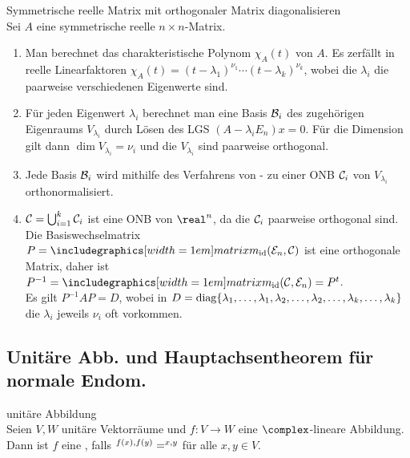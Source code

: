 \begin{Prozedur}%
{Symmetrische reelle Matrix mit orthogonaler Matrix diagonalisieren} \\
    Sei $A$ eine symmetrische reelle $n \times n$-Matrix.
    \begin{enumerate}
        \item Man berechnet das charakteristische Polynom $\chi_A(t)$ von $A$.
        Es zerfällt in reelle Linearfaktoren
        $\chi_A(t) = (t - \lambda_1)^{\nu_1} \cdots (t - \lambda_k)^{\nu_k}$,
        wobei die $\lambda_i$ die paarweise verschiedenen Eigenwerte sind.

        \item Für jeden Eigenwert $\lambda_i$ berechnet man eine Basis
        $\mathcal{B}_i$ des zugehörigen Eigenraums $V_{\lambda_i}$ durch Lösen
        des LGS $(A - \lambda_i E_n)x = 0$.
        Für die Dimension gilt dann $\dim V_{\lambda_i} = \nu_i$ und die
        $V_{\lambda_i}$ sind paarweise orthogonal.

        \item Jede Basis $\mathcal{B}_i$ wird mithilfe des Verfahrens
        von - zu einer ONB $\mathcal{C}_i$ von
        $V_{\lambda_i}$ orthonormalisiert.

        \item $\mathcal{C} = \bigcup_{i=1}^k \mathcal{C}_i$ ist eine ONB von
        $\real^n$, da die $\mathcal{C}_i$ paarweise orthogonal sind.
        Die Basiswechselmatrix $P = \matrixm_{\id}(\basis{E}_n, \basis{C})$
        ist eine orthogonale Matrix, daher ist
        $P^{-1} = \matrixm_{\id}(\basis{C}, \basis{E}_n) = P^t$. \\
        Es gilt $P^{-1} A P = D$, wobei in
        $D = \operatorname{diag}\{\lambda_1, \ldots, \lambda_1, \lambda_2, \ldots,
        \lambda_2, \ldots, \lambda_k, \ldots, \lambda_k\}$ die $\lambda_i$
        jeweils $\nu_i$ oft vorkommen.
    \end{enumerate}
\end{Prozedur}

\subsection{%
    Unitäre Abb. und Hauptachsentheorem für normale Endom.%
}

\begin{Def}{unitäre Abbildung} \\
    Seien $V, W$ unitäre Vektorräume und $f: V \rightarrow W$ eine
    $\complex$-lineare Abbildung. \\
    Dann ist $f$ eine , falls
    $\sp{f(x), f(y)} = \sp{x, y}$ für alle $x, y \in V$.
\end{Def}

